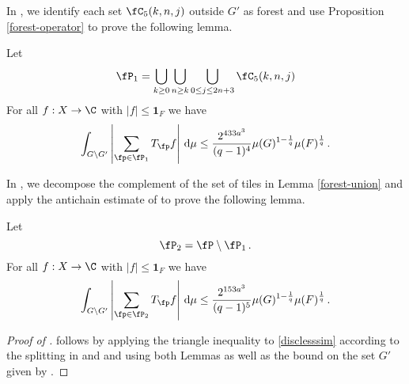 In , we identify each set $\fC_5(k,n,j)$ outside $G'$ as forest and use Proposition
\ref{forest-operator} to prove the following lemma.

\begin{lemma}
    \label{forest-union}
    \leanok
    Let
    \begin{equation}
        \fP_1 =\bigcup_{k\ge 0}\bigcup_{n\ge k}
        \bigcup_{0\le j\le 2n+3}\fC_5(k,n,j)
    \end{equation}
    For all $f:X\to \C$ with $|f|\le \mathbf{1}_F$ we have
    \begin{equation}
        \label{disclesssim1}
        \int_{G \setminus G'} \left|\sum_{\fp \in \fP_1} T_{\fp} f \right|\, \mathrm{d}\mu \le \frac{2^{433a^3}}{(q-1)^4} \mu(G)^{1 - \frac{1}{q}} \mu(F)^{\frac{1}{q}}\,.
    \end{equation}
\end{lemma}

In , we decompose
the complement of the set of tiles in Lemma
\ref{forest-union} and apply the antichain estimate of
 to prove the following lemma.

\begin{lemma}
    \label{forest-complement}
    \leanok
    Let
    \begin{equation}
        \fP_2 =\fP\setminus \fP_1\,.
    \end{equation}
    For all $f:X\to \C$ with $|f|\le \mathbf{1}_F$ we have
    \begin{equation}
        \label{disclesssim2}
        \int_{G \setminus G'} \left|\sum_{\fp \in \fP_2} T_{\fp} f\right| \, \mathrm{d}\mu \le \frac{2^{153a^3}}{(q-1)^5} \mu(G)^{1 - \frac{1}{q}} \mu(F)^{\frac{1}{q}}\,.
    \end{equation}
\end{lemma}

\begin{proof}[Proof of ]
\leanok
{}
 follows by applying the
triangle inequality to \eqref{disclesssim}
according to the splitting in 
and  and using both Lemmas as well
as the bound on the set $G'$ given by .
\end{proof}

